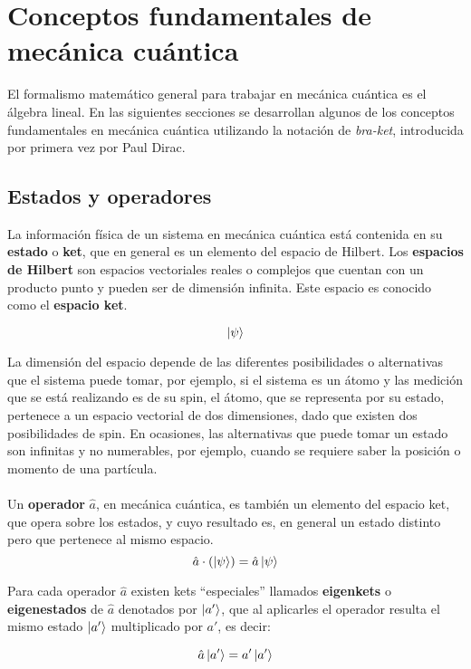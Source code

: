 \chapter{Conceptos fundamentales de mecánica cuántica}\label{ch:2}

El formalismo matemático general para trabajar en  mecánica cuántica es el álgebra lineal. En las siguientes secciones se desarrollan algunos de los conceptos fundamentales en mecánica cuántica utilizando la notación de \emph{bra-ket}, introducida por primera vez por Paul Dirac.

\section{Estados y operadores}\label{sec:Estados y Operadores}
La información física de un sistema en mecánica cuántica está contenida en su \textbf{estado} o \textbf{ket}, que en general es un elemento del espacio de Hilbert. Los \textbf{espacios de Hilbert} son espacios vectoriales reales o complejos que cuentan con un producto punto y pueden ser de dimensión infinita. Este espacio es conocido como el \textbf{espacio ket}.

\[
\ket{\psi}
\]

La dimensión del espacio depende de las diferentes posibilidades o alternativas que el sistema puede tomar, por ejemplo, si el sistema es un átomo y las medición que se está realizando es de su spin, el átomo, que se representa por su estado, pertenece a un espacio vectorial de dos dimensiones, dado que existen dos posibilidades de spin. En ocasiones, las alternativas que puede tomar un estado son infinitas y no numerables, por ejemplo, cuando se requiere saber la posición o momento de una partícula.
\\
\\
Un \textbf{operador} $\hat{a}$, en mecánica cuántica, es también un elemento del espacio ket, que opera sobre los estados, y cuyo resultado es, en general un estado distinto pero que pertenece al mismo espacio.
\[
\hat{a} \cdot (\ket{\psi}) = \hat{a}\ket{\psi}
\]

Para cada operador $\hat{a}$ existen kets ``especiales'' llamados \textbf{eigenkets} o \textbf{eigenestados} de $\hat{a}$ denotados por $\ket{a'}$, que al aplicarles el operador resulta el mismo estado $\ket{a'}$ multiplicado por $a'$, es decir:

\[ \hat{a}\ket{a'} = a'\ket{a'}\]

